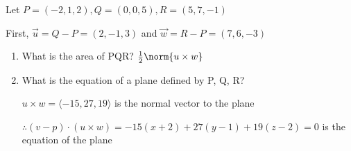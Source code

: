 \documentclass{scrreprt}
\begin{document}
\begin{example}
	Let $P = (-2, 1, 2), Q = (0, 0, 5), R = (5, 7, -1)$

	First, $\vec{u} = Q - P = (2, -1, 3)$ and $\vec{w} = R - P = (7, 6, -3)$

	\begin{enumerate}
		\item What is the area of PQR? $\frac{1}{2} \norm{u\times w}$
		\item What is the equation of a plane defined by P, Q, R?

		      $u\times w = \langle -15, 27, 19 \rangle$ is the normal vector to the plane

		      $\therefore (v - p) \cdot (u\times w) = -15(x + 2) + 27(y - 1) + 19(z-2) = 0$ is the equation of the plane
	\end{enumerate}
\end{example}
\end{document}
